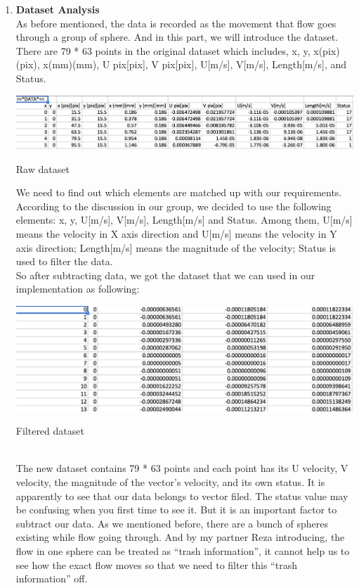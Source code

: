 \documentclass[letterpaper,12pt,titlepage,fleqn]{article}
\begin{document}
\begin{CJK}{UTF8}{gkai}
\begin{enumerate}
\item \textbf{Dataset Analysis}\\
As before mentioned, the data is recorded as the movement that flow goes through a group of sphere. And in this part, we will introduce the dataset.\\
There are 79 * 63 points in the original dataset which includes, x, y, x(pix)(pix), x(mm)(mm), U pix[pix], V pix[pix], U[m/s], V[m/s], Length[m/s], and Status. 

\begin{table}[!h]
	\centering
	\includegraphics[width=\linewidth]{data1.jpg}
	\caption{Raw dataset}
\end{table}

We need to find out which elements are matched up with our requirements. According to the discussion in our group, we decided to use the following elements: x, y, U[m/s], V[m/s], Length[m/s] and Status. Among them, U[m/s] means the velocity in X axis direction and U[m/s] means the velocity in Y axis direction; Length[m/s] means the magnitude of the velocity; Status is used to filter the data.\\
So after subtracting data, we got the dataset that we can used in our implementation as following:
\begin{table}[h]
	\centering
	\includegraphics[width=\linewidth]{data2.jpg}
	\caption{Filtered dataset}
\end{table} \\
The new dataset contains 79 * 63 points and each point has its U velocity, V velocity, the magnitude of the vector’s velocity, and its own status. It is apparently to see that our data belongs to vector filed.
The status value may be confusing when you first time to see it. But it is an important factor to subtract our data. As we mentioned before, there are a bunch of spheres existing while flow going through. And by my partner Reza introducing, the flow in one sphere can be treated as “trash information”, it cannot help us to see how the exact flow moves so that we need to filter this “trash information” off.


\end{enumerate}
\end{CJK}
\end{document}
